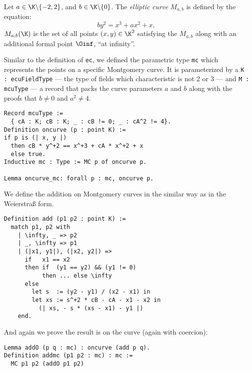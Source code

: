 \begin{dfn}
  Let $a \in \K \backslash \{-2, 2\}$, and $b \in \K \backslash \{ 0\}$.
  The \textit{elliptic curve} $M_{a,b}$ is defined by the equation:
  $$by^2 = x^3 + ax^2 + x,$$
  $M_{a,b}(\K)$ is the set of all points $(x,y) \in \K^2$ satisfying the $M_{a,b}$
  along with an additional formal point $\Oinf$, ``at infinity''.
\end{dfn}
Similar to the definition of \texttt{ec}, we defined the parametric type \texttt{mc} which
represents the points on a specific Montgomery curve.
It is parameterized by
a \texttt{K : ecuFieldType} --- the type of fields which characteristic is not
2 or 3 --- and \texttt{M : mcuType} --- a record that packs the curve
parameters $a$ and $b$ along with the proofs that $b \neq 0$ and $a^2 \neq 4$.
\begin{lstlisting}[language=Coq]
Record mcuType :=
  { cA : K; cB : K; _ : cB != 0; _ : cA^2 != 4}.
Definition oncurve (p : point K) :=
if p is (| x, y |)
  then cB * y^+2 == x^+3 + cA * x^+2 + x
  else true.
Inductive mc : Type := MC p of oncurve p.

Lemma oncurve_mc: forall p : mc, oncurve p.
\end{lstlisting}
We define the addition on Montgomery curves in the similar way as in the Weierstra{\ss} form.
\begin{lstlisting}[language=Coq]
Definition add (p1 p2 : point K) :=
  match p1, p2 with
    | \infty, _ => p2
    | _, \infty => p1
    | (|x1, y1|), (|x2, y2|) =>
      if   x1 == x2
      then if  (y1 == y2) && (y1 != 0)
           then ... else \infty
      else
        let s  := (y2 - y1) / (x2 - x1) in
        let xs := s^+2 * cB - cA - x1 - x2 in
          (| xs, - s * (xs - x1) - y1 |)
    end.
\end{lstlisting}
And again we prove the result is on the curve (again with coercion):
\begin{lstlisting}[language=Coq]
Lemma addO (p q : mc) : oncurve (add p q).
Definition addmc (p1 p2 : mc) : mc :=
  MC p1 p2 (addO p1 p2)
\end{lstlisting}


